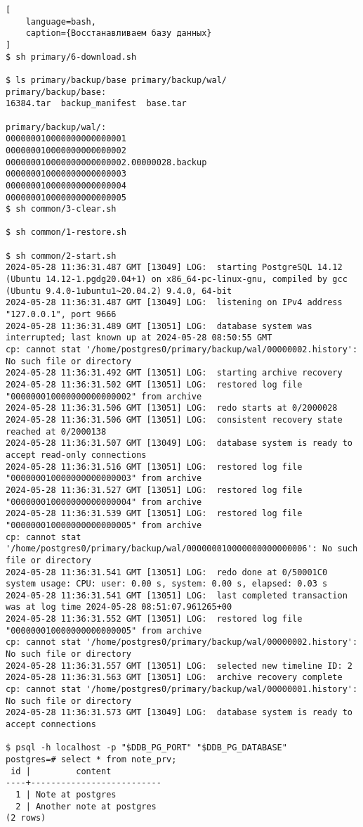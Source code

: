 \documentclass{article}
\begin{document}
\begin{lstlisting}[
    language=bash,
    caption={Восстанавливаем базу данных}
]
$ sh primary/6-download.sh 

$ ls primary/backup/base primary/backup/wal/
primary/backup/base:
16384.tar  backup_manifest  base.tar

primary/backup/wal/:
000000010000000000000001
000000010000000000000002
000000010000000000000002.00000028.backup
000000010000000000000003
000000010000000000000004
000000010000000000000005
$ sh common/3-clear.sh 

$ sh common/1-restore.sh 

$ sh common/2-start.sh 
2024-05-28 11:36:31.487 GMT [13049] LOG:  starting PostgreSQL 14.12 (Ubuntu 14.12-1.pgdg20.04+1) on x86_64-pc-linux-gnu, compiled by gcc (Ubuntu 9.4.0-1ubuntu1~20.04.2) 9.4.0, 64-bit
2024-05-28 11:36:31.487 GMT [13049] LOG:  listening on IPv4 address "127.0.0.1", port 9666
2024-05-28 11:36:31.489 GMT [13051] LOG:  database system was interrupted; last known up at 2024-05-28 08:50:55 GMT
cp: cannot stat '/home/postgres0/primary/backup/wal/00000002.history': No such file or directory
2024-05-28 11:36:31.492 GMT [13051] LOG:  starting archive recovery
2024-05-28 11:36:31.502 GMT [13051] LOG:  restored log file "000000010000000000000002" from archive
2024-05-28 11:36:31.506 GMT [13051] LOG:  redo starts at 0/2000028
2024-05-28 11:36:31.506 GMT [13051] LOG:  consistent recovery state reached at 0/2000138
2024-05-28 11:36:31.507 GMT [13049] LOG:  database system is ready to accept read-only connections
2024-05-28 11:36:31.516 GMT [13051] LOG:  restored log file "000000010000000000000003" from archive
2024-05-28 11:36:31.527 GMT [13051] LOG:  restored log file "000000010000000000000004" from archive
2024-05-28 11:36:31.539 GMT [13051] LOG:  restored log file "000000010000000000000005" from archive
cp: cannot stat '/home/postgres0/primary/backup/wal/000000010000000000000006': No such file or directory
2024-05-28 11:36:31.541 GMT [13051] LOG:  redo done at 0/50001C0 system usage: CPU: user: 0.00 s, system: 0.00 s, elapsed: 0.03 s
2024-05-28 11:36:31.541 GMT [13051] LOG:  last completed transaction was at log time 2024-05-28 08:51:07.961265+00
2024-05-28 11:36:31.552 GMT [13051] LOG:  restored log file "000000010000000000000005" from archive
cp: cannot stat '/home/postgres0/primary/backup/wal/00000002.history': No such file or directory
2024-05-28 11:36:31.557 GMT [13051] LOG:  selected new timeline ID: 2
2024-05-28 11:36:31.563 GMT [13051] LOG:  archive recovery complete
cp: cannot stat '/home/postgres0/primary/backup/wal/00000001.history': No such file or directory
2024-05-28 11:36:31.573 GMT [13049] LOG:  database system is ready to accept connections

$ psql -h localhost -p "$DDB_PG_PORT" "$DDB_PG_DATABASE"
postgres=# select * from note_prv;
 id |         content          
----+--------------------------
  1 | Note at postgres
  2 | Another note at postgres
(2 rows)
\end{lstlisting}
\end{document}
